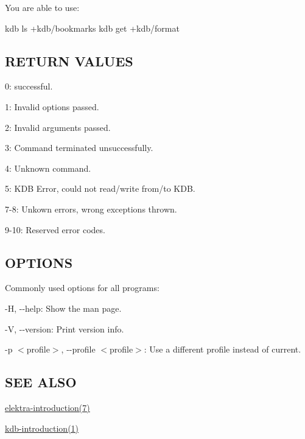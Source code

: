 You are able to use\+: \begin{DoxyVerb}    kdb ls +kdb/bookmarks
    kdb get +kdb/format
\end{DoxyVerb}


\subsection*{R\+E\+T\+U\+R\+N V\+A\+L\+U\+E\+S}


\begin{DoxyItemize}
\item 0\+: successful.
\item 1\+: Invalid options passed.
\item 2\+: Invalid arguments passed.
\item 3\+: Command terminated unsuccessfully.
\item 4\+: Unknown command.
\item 5\+: K\+D\+B Error, could not read/write from/to K\+D\+B.
\item 7-\/8\+: Unkown errors, wrong exceptions thrown.
\item 9-\/10\+: Reserved error codes.
\end{DoxyItemize}

\subsection*{O\+P\+T\+I\+O\+N\+S}

Commonly used options for all programs\+:


\begin{DoxyItemize}
\item {\ttfamily -\/\+H}, {\ttfamily -\/-\/help}\+: Show the man page.
\item {\ttfamily -\/\+V}, {\ttfamily -\/-\/version}\+: Print version info.
\item {\ttfamily -\/p $<$profile$>$}, {\ttfamily -\/-\/profile $<$profile$>$}\+: Use a different profile instead of current.
\end{DoxyItemize}

\subsection*{S\+E\+E A\+L\+S\+O}


\begin{DoxyItemize}
\item \hyperlink{md_doc_help_elektra-introduction_doc_help_elektra-introduction_md}{elektra-\/introduction(7)}
\item \hyperlink{md_doc_help_kdb-introduction_doc_help_kdb-introduction_md}{kdb-\/introduction(1)} 
\end{DoxyItemize}
